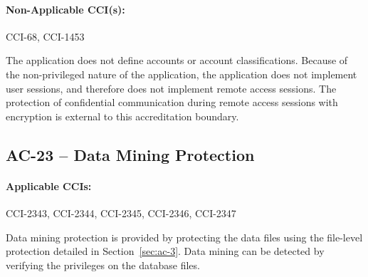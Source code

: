 \documentclass[letterpaper, 10pt, twoside]{article}
\begin{document}
\paragraph{Non-Applicable CCI(s):} CCI-68, CCI-1453

The application does not define accounts or account classifications. Because of the non-privileged nature of the application, the application does not implement user sessions, and therefore does not implement remote access sessions. The protection of confidential communication during remote access sessions with encryption is external to this accreditation boundary.

\subsection{AC-23 -- Data Mining Protection}

\paragraph{Applicable CCIs:} CCI-2343, CCI-2344, CCI-2345, CCI-2346, CCI-2347

Data mining protection is provided by protecting the data files using the file-level protection detailed in Section~\ref{sec:ac-3}. Data mining can be detected by verifying the privileges on the database files.

\clearpage
\printbibliography
\end{document}

